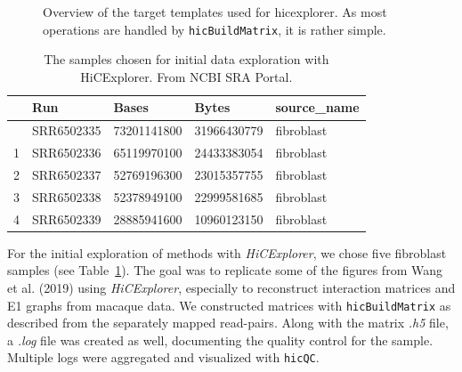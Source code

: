 \documentclass[
  11pt,
  a4paper,
]{scrbook}
\let\oldemph\emph
\renewcommand\emph[1]{\oldemph{\color{gray}#1}}
\begin{document}
\begin{figure}


\caption{\label{fig-hicexplorer-workflow}Overview of the target
templates used for hicexplorer. As most operations are handled by
\texttt{hicBuildMatrix}, it is rather simple.}

\end{figure}%

\small

\begin{longtable}[]{@{}lllll@{}}

\caption{\label{tbl-hic-exploration}The samples chosen for initial data
exploration with HiCExplorer. From NCBI SRA Portal.}

\tabularnewline

\toprule\noalign{}
& Run & Bases & Bytes & source\_name \\
\midrule\noalign{}
\endhead
\bottomrule\noalign{}
\endlastfoot
0 & SRR6502335 & 73201141800 & 31966430779 & fibroblast \\
1 & SRR6502336 & 65119970100 & 24433383054 & fibroblast \\
2 & SRR6502337 & 52769196300 & 23015357755 & fibroblast \\
3 & SRR6502338 & 52378949100 & 22999581685 & fibroblast \\
4 & SRR6502339 & 28885941600 & 10960123150 & fibroblast \\

\end{longtable}

\normalsize

For the initial exploration of methods with \emph{HiCExplorer}, we chose
five fibroblast samples (see Table~\ref{tbl-hic-exploration}). The goal
was to replicate some of the figures from Wang et al. (2019) using
\emph{HiCExplorer}, especially to reconstruct interaction matrices and
E1 graphs from macaque data. We constructed matrices with
\texttt{hicBuildMatrix} as described from the separately mapped
read-pairs. Along with the matrix \emph{.h5} file, a \emph{.log} file
was created as well, documenting the quality control for the sample.
Multiple logs were aggregated and visualized with \texttt{hicQC}.
\end{document}
